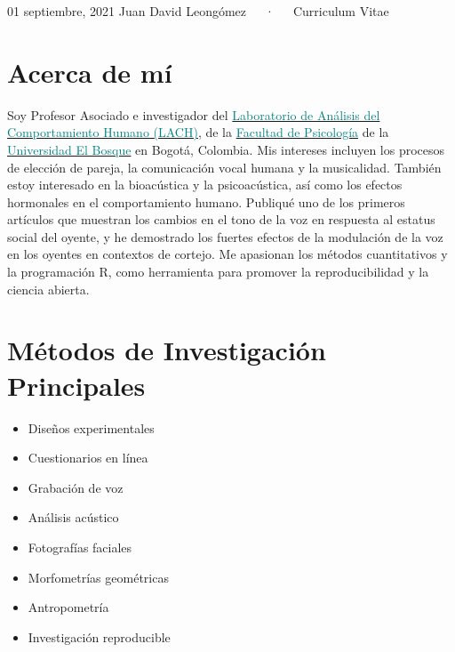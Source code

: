 \documentclass[11pt, a4paper]{awesome-cv}
\begin{document}
\makecvheader

\makecvfooter
  {01 septiembre, 2021}
    {Juan David Leongómez~~~·~~~Curriculum Vitae}
  {\thepage}





\hypertarget{acerca-de-muxed}{%
\section{Acerca de mí}\label{acerca-de-muxed}}

Soy Profesor Asociado e investigador del
\href{https://www.psicologia.unbosque.edu.co/lach}{\textcolor{teal}{Laboratorio de Análisis del Comportamiento Humano (LACH)}},
de la
\href{https://www.uelbosque.edu.co/psicologia}{\textcolor{teal}{Facultad de Psicología}}
de la
\href{https://www.uelbosque.edu.co/}{\textcolor{teal}{Universidad El Bosque}}
en Bogotá, Colombia. Mis intereses incluyen los procesos de elección de
pareja, la comunicación vocal humana y la musicalidad. También estoy
interesado en la bioacústica y la psicoacústica, así como los efectos
hormonales en el comportamiento humano. Publiqué uno de los primeros
artículos que muestran los cambios en el tono de la voz en respuesta al
estatus social del oyente, y he demostrado los fuertes efectos de la
modulación de la voz en los oyentes en contextos de cortejo. Me
apasionan los métodos cuantitativos y la programación R, como
herramienta para promover la reproducibilidad y la ciencia abierta.

\hypertarget{muxe9todos-de-investigaciuxf3n-principales}{%
\section{Métodos de Investigación
Principales}\label{muxe9todos-de-investigaciuxf3n-principales}}

\begin{multicols}{2}
\begin{itemize}
 \item Diseños experimentales
 \item Cuestionarios en línea 
 \item Grabación de voz
 \item Análisis acústico
 \item Fotografías faciales
 \item Morfometrías geométricas
 \item Antropometría
 \item Investigación reproducible
\end{itemize}
\end{multicols}
\end{document}
